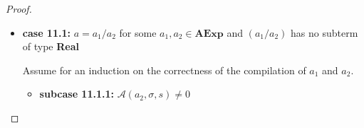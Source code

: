 \documentclass{article}
\begin{document}
\begin{proof}
\begin{itemize}
    \[
      \begin{aligned}
        &\langle  \mathcal{CA}(a) : c,\, e,\, \sigma,\, s,\, pc \rangle \\
        &= \langle \mathcal{CA}(a_1 - a_2) : c,\, e,\, \sigma,\, s,\, pc \rangle \\
        &= \langle \mathcal{CA}(a_2) : \mathcal{CA}(a_1) : \texttt{SUB} :  c,\, e,\, \sigma,\, s,\, pc \rangle 
        && \text{(definition of } \mathcal{CA}\text{)} \\
        &\triangleright^{\ast} \langle \mathcal{CA}(a_1) : \texttt{SUB} :  c,\, \mathcal{A}(a_2, \sigma, s) : e,\, \sigma,\, s,\, pc + l_2 \rangle 
        && \text{(induction hypothesis 2)} \\
        &\triangleright^{\ast} \langle \texttt{SUB} :  c,\, \mathcal{A}(a_1, \sigma, s) : \mathcal{A}(a_2, \sigma, s) : e,\, \sigma,\, s,\, pc + l_2 + l_1 \rangle
        && \text{(induction hypothesis 1)} \\
        &\triangleright \langle c,\, (\mathcal{A}(a_1, \sigma, s) - \mathcal{A}(a_2, \sigma, s)) : e,\, \sigma,\, s,\, pc + l_2 + l_1 + 1 \rangle
        && \text{(operational semantics)} \\
        &= \langle c,\, \mathcal{A}(a_1 - a_2, \sigma, s) : e,\, \sigma,\, s,\, pc + l_2 + l_1 + 1 \rangle
        && \text{(definition of } \mathcal{A}\text{)} \\
        &= \langle c,\, \mathcal{A}(a, \sigma, s) : e,\, \sigma,\, s,\, pc + l_2 + l_1 + 1 \rangle \\
      \end{aligned}
  \]

    \item \textbf{case 11.1: } $a = a_1 / a_2$ for some $a_1, a_2 \in \textbf{AExp}$ and $(a_1 / a_2)$ has no subterm of type \textbf{Real}

    Assume for an induction on the correctness of the compilation of $a_1$ and $a_2$.

        \begin{itemize}
            \item \textbf{subcase 11.1.1: } $\mathcal{A}(a_2, \sigma, s) \neq 0$


\end{itemize}
\end{itemize}
\end{proof}
\end{document}
